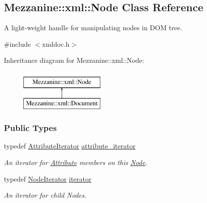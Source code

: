 \hypertarget{classMezzanine_1_1xml_1_1Node}{
\subsection{Mezzanine::xml::Node Class Reference}
\label{classMezzanine_1_1xml_1_1Node}
}


A light-\/weight handle for manipulating nodes in DOM tree.  




{\ttfamily \#include $<$xmldoc.h$>$}

Inheritance diagram for Mezzanine::xml::Node:\begin{figure}[H]
\begin{center}
\leavevmode
\includegraphics[height=2.000000cm]{classMezzanine_1_1xml_1_1Node}
\end{center}
\end{figure}
\subsubsection*{Public Types}
\begin{DoxyCompactItemize}
\item 
\hypertarget{classMezzanine_1_1xml_1_1Node_a7ced1204b9d48db5803377ef8119206d}{
typedef \hyperlink{classMezzanine_1_1xml_1_1AttributeIterator}{AttributeIterator} \hyperlink{classMezzanine_1_1xml_1_1Node_a7ced1204b9d48db5803377ef8119206d}{attribute\_\-iterator}}
\label{classMezzanine_1_1xml_1_1Node_a7ced1204b9d48db5803377ef8119206d}

\begin{DoxyCompactList}\small\item\em An iterator for \hyperlink{classMezzanine_1_1xml_1_1Attribute}{Attribute} members on this \hyperlink{classMezzanine_1_1xml_1_1Node}{Node}. \item\end{DoxyCompactList}\item 
\hypertarget{classMezzanine_1_1xml_1_1Node_ab179c41680cc107bef8ebd377faed0b6}{
typedef \hyperlink{classMezzanine_1_1xml_1_1NodeIterator}{NodeIterator} \hyperlink{classMezzanine_1_1xml_1_1Node_ab179c41680cc107bef8ebd377faed0b6}{iterator}}
\label{classMezzanine_1_1xml_1_1Node_ab179c41680cc107bef8ebd377faed0b6}

\begin{DoxyCompactList}\small\item\em An iterator for child Nodes. \item\end{DoxyCompactList}\end{DoxyCompactItemize}
